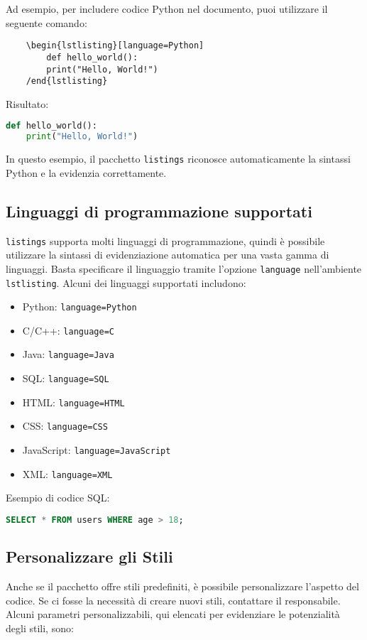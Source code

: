 Ad esempio, per includere codice Python nel documento, puoi utilizzare il seguente comando:

\begin{lstlisting}
	\begin{lstlisting}[language=Python]
		def hello_world():
		print("Hello, World!")
	/end{lstlisting}
\end{lstlisting}

Risultato:
\begin{lstlisting}[language=Python]
	def hello_world():
	print("Hello, World!")
\end{lstlisting}

In questo esempio, il pacchetto \texttt{listings} riconosce automaticamente la sintassi Python e la evidenzia correttamente.

\subsection{Linguaggi di programmazione supportati}
\texttt{listings} supporta molti linguaggi di programmazione, quindi è possibile utilizzare la sintassi di evidenziazione automatica per una vasta gamma di linguaggi. Basta specificare il linguaggio tramite l'opzione \texttt{language} nell'ambiente \texttt{lstlisting}. Alcuni dei linguaggi supportati includono:

\begin{itemize}
	\item Python: \texttt{language=Python}
	\item C/C++: \texttt{language=C}
	\item Java: \texttt{language=Java}
	\item SQL: \texttt{language=SQL}
	\item HTML: \texttt{language=HTML}
	\item CSS: \texttt{language=CSS}
	\item JavaScript: \texttt{language=JavaScript}
	\item XML: \texttt{language=XML}
\end{itemize}

Esempio di codice SQL:

\begin{lstlisting}[language=SQL]
	SELECT * FROM users WHERE age > 18;
\end{lstlisting}

\subsection{Personalizzare gli Stili}
Anche se il pacchetto offre stili predefiniti, è possibile personalizzare l'aspetto del codice. Se ci fosse la necessità di creare nuovi stili, contattare il responsabile. Alcuni parametri personalizzabili, qui elencati per evidenziare le potenzialità degli stili, sono:


